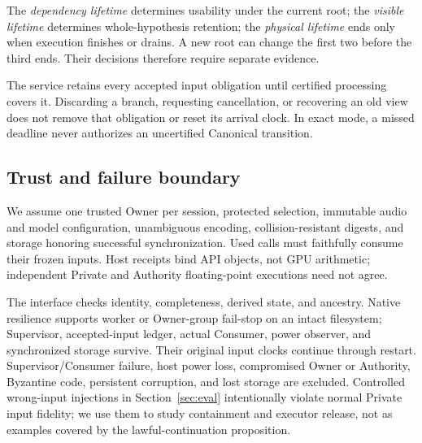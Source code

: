The \emph{dependency lifetime} determines usability under the current
root; the \emph{visible lifetime} determines whole-hypothesis retention;
the \emph{physical lifetime} ends only when execution finishes or drains.
A new root can change the first two before the third ends. Their decisions
therefore require separate evidence.

The service retains every accepted input obligation until certified
processing covers it. Discarding a branch, requesting cancellation, or
recovering an old view does not remove that obligation or reset its arrival
clock. In exact mode, a missed deadline never authorizes an uncertified
Canonical transition.

\subsection{Trust and failure boundary}
We assume one trusted Owner per session, protected selection, immutable
audio and model configuration, unambiguous encoding, collision-resistant
digests, and storage honoring successful synchronization. Used calls must
faithfully consume their frozen inputs. Host receipts bind API objects,
not GPU arithmetic; independent Private and Authority floating-point
executions need not agree.

The interface checks identity, completeness, derived state, and ancestry.
Native resilience supports worker or Owner-group fail-stop on an intact
filesystem; Supervisor, accepted-input ledger, actual Consumer, power
observer, and synchronized storage survive. Their original input clocks
continue through restart. Supervisor/Consumer failure, host power loss,
compromised Owner or Authority, Byzantine code, persistent corruption,
and lost storage are excluded. Controlled wrong-input injections in
Section~\ref{sec:eval} intentionally violate normal Private input fidelity;
we use them to study containment and executor release, not as examples
covered by the lawful-continuation proposition.
